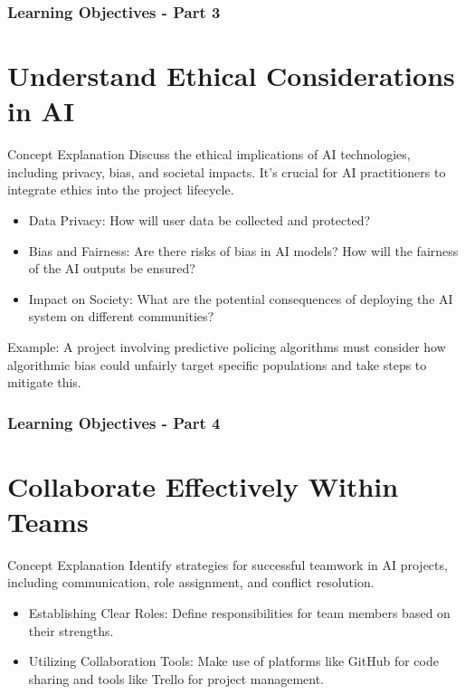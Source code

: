\documentclass[aspectratio=169]{beamer}
\begin{document}
\begin{frame}[fragile]
    \frametitle{Learning Objectives - Part 3}
    \section{Understand Ethical Considerations in AI}
    \begin{block}{Concept Explanation}
        Discuss the ethical implications of AI technologies, including privacy, bias, and societal impacts. It’s crucial for AI practitioners to integrate ethics into the project lifecycle.
    \end{block}
    \begin{itemize}
        \item Data Privacy: How will user data be collected and protected?
        \item Bias and Fairness: Are there risks of bias in AI models? How will the fairness of the AI outputs be ensured?
        \item Impact on Society: What are the potential consequences of deploying the AI system on different communities?
    \end{itemize}
    \begin{example}
        Example: A project involving predictive policing algorithms must consider how algorithmic bias could unfairly target specific populations and take steps to mitigate this.
    \end{example}
\end{frame}

\begin{frame}[fragile]
    \frametitle{Learning Objectives - Part 4}
    \section{Collaborate Effectively Within Teams}
    \begin{block}{Concept Explanation}
        Identify strategies for successful teamwork in AI projects, including communication, role assignment, and conflict resolution.
    \end{block}
    \begin{itemize}
        \item Establishing Clear Roles: Define responsibilities for team members based on their strengths.
        \item Utilizing Collaboration Tools: Make use of platforms like GitHub for code sharing and tools like Trello for project management.
    \end{itemize}
\end{frame}
\end{document}
